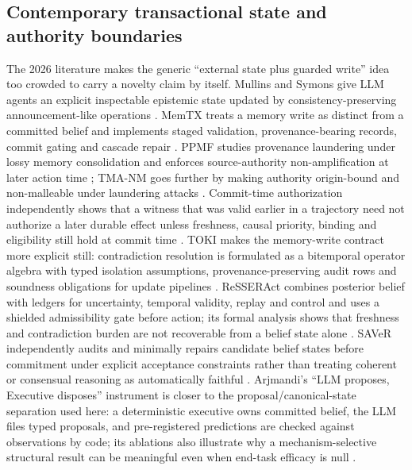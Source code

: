 \subsection{Contemporary transactional state and authority boundaries}

The 2026 literature makes the generic ``external state plus guarded write'' idea too crowded to carry a novelty claim by itself. Mullins and Symons give LLM agents an explicit inspectable epistemic state updated by consistency-preserving announcement-like operations \cite{mullins2026}. MemTX treats a memory write as distinct from a committed belief and implements staged validation, provenance-bearing records, commit gating and cascade repair \cite{memtx2026}. PPMF studies provenance laundering under lossy memory consolidation and enforces source-authority non-amplification at later action time \cite{ppmf2026}; TMA-NM goes further by making authority origin-bound and non-malleable under laundering attacks \cite{tmanm2026}. Commit-time authorization independently shows that a witness that was valid earlier in a trajectory need not authorize a later durable effect unless freshness, causal priority, binding and eligibility still hold at commit time \cite{committime2026}. TOKI makes the memory-write contract more explicit still: contradiction resolution is formulated as a bitemporal operator algebra with typed isolation assumptions, provenance-preserving audit rows and soundness obligations for update pipelines \cite{toki2026}. ReSSERAct combines posterior belief with ledgers for uncertainty, temporal validity, replay and control and uses a shielded admissibility gate before action; its formal analysis shows that freshness and contradiction burden are not recoverable from a belief state alone \cite{ozturk2026resseract}. SAVeR independently audits and minimally repairs candidate belief states before commitment under explicit acceptance constraints rather than treating coherent or consensual reasoning as automatically faithful \cite{yuan2026saver}. Arjmandi's ``LLM proposes, Executive disposes'' instrument is closer to the proposal/canonical-state separation used here: a deterministic executive owns committed belief, the LLM files typed proposals, and pre-registered predictions are checked against observations by code; its ablations also illustrate why a mechanism-selective structural result can be meaningful even when end-task efficacy is null \cite{arjmandi2026}.

